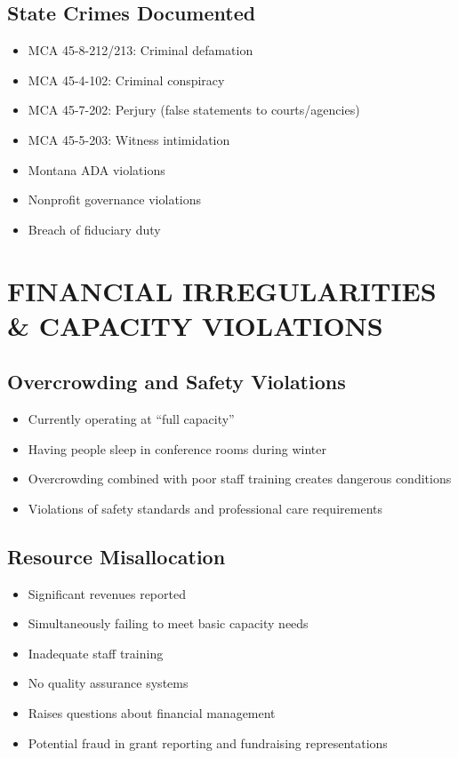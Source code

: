 \documentclass[12pt,oneside]{article}
\begin{document}
\subsection*{State Crimes Documented}

\begin{itemize}
\item MCA 45-8-212/213: Criminal defamation
\item MCA 45-4-102: Criminal conspiracy
\item MCA 45-7-202: Perjury (false statements to courts/agencies)
\item MCA 45-5-203: Witness intimidation
\item Montana ADA violations
\item Nonprofit governance violations
\item Breach of fiduciary duty
\end{itemize}

\section*{FINANCIAL IRREGULARITIES \& CAPACITY VIOLATIONS}

\subsection*{Overcrowding and Safety Violations}

\begin{itemize}
\item Currently operating at ``full capacity''
\item Having people sleep in conference rooms during winter
\item Overcrowding combined with poor staff training creates dangerous conditions
\item Violations of safety standards and professional care requirements
\end{itemize}

\subsection*{Resource Misallocation}

\begin{itemize}
\item Significant revenues reported
\item Simultaneously failing to meet basic capacity needs
\item Inadequate staff training
\item No quality assurance systems
\item Raises questions about financial management
\item Potential fraud in grant reporting and fundraising representations
\end{itemize}
\end{document}
